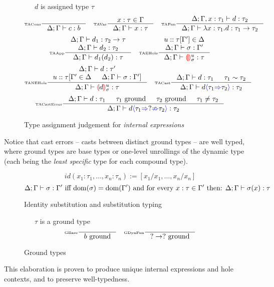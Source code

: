 \begin{figure}
\small
{}\ \ \ $d$ is assigned type $\tau$
\tiny
\[\inference[\tiny TACons]{}{\typeassignment{c}{b}}\quad
\inference[\tiny TAVar]{x : \tau \in \Gamma}{\typeassignment{x}{\tau}}\quad
\inference[\tiny TAFun]{\typeassignment[\Delta;\Gamma,x:\tau_1]{d}{\tau_2}}{\typeassignment{\lambda x:\tau_1. d}{\tau_1 \to \tau_2}}\]
\[\inference[\tiny TAApp]{\typeassignment{d_1}{\tau_2 \to \tau} \\ \typeassignment{d_2}{\tau_2}}{\typeassignment{d_1(d_2)}{\tau}} \quad 
\inference[\tiny TAEHole]{u :: \tau[\Gamma'] \in \Delta \\ \typeassignment{\sigma}{\Gamma'}}{\typeassignment{\hole^u_\sigma}{\tau}}\]
\[
\inference[\tiny TANEHole]{\typeassignment{d}{\tau'} \\ u :: \tau[\Gamma' \in \Delta & \typeassignment{\sigma}{\Gamma'}]}{\typeassignment{\hole[d]^u_\sigma}{\tau}}\quad 
\inference[\tiny TACast]{\typeassignment{d}{\tau_1} & \tau_1 \sim \tau_2}{\typeassignment{d\scast{\tau_1}{\tau_2}}{\tau_2}}\]
\[\inference[\tiny TACastError]{\typeassignment{d}{\tau_1} & \tau_1\text{ ground} & \tau_2\text{ ground} & \tau_1 \neq \tau_2}{\typeassignment{d\scasterror{\tau_1}{\tau_2}}{\tau_2}}\]
\caption{Type assignment judgement for \textit{internal expressions}}
\label{fig:typeassignment}
\end{figure}
Notice that cast errors -- casts between distinct ground types -- are well typed, where ground types are base types or one-level unrollings of the dynamic type (each being the \textit{least specific} type for each compound type).
\begin{figure}
\tiny
\[id(x_1:\tau_1, \dots, x_n:\tau_n) := [x_1/x_1, \dots, x_n/x_n]\]
\[\Delta;\Gamma \vdash \sigma : \Gamma' \text{ iff } \mathrm{dom}(\sigma) = \mathrm{dom}(\Gamma')\text{ and for every } x : \tau \in \Gamma' \text{ then:
} \Delta;\Gamma \vdash \sigma(x) : \tau\]
\caption{Identity substitution and substitution typing}
\label{fig:substitutiontyping}
\end{figure}

\begin{figure}
\tiny
{}\ \ \ $\tau$ is a ground type
\[\inference[\tiny GBase]{}{b\text{ ground}}\quad \inference[\tiny GDynFun]{}{? \to ?\text{ ground}}\]
\caption{Ground types}
\label{fig:groundtypes}
\end{figure}
This elaboration is proven to produce unique internal expressions and hole contexts, and to preserve well-typedness.

